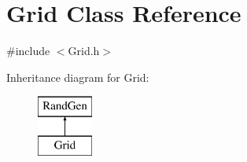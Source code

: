 \hypertarget{class_grid}{}\section{Grid Class Reference}
\label{class_grid}


{\ttfamily \#include $<$Grid.\+h$>$}

Inheritance diagram for Grid\+:\begin{figure}[H]
\begin{center}
\leavevmode
\includegraphics[height=2.000000cm]{class_grid}
\end{center}
\end{figure}
